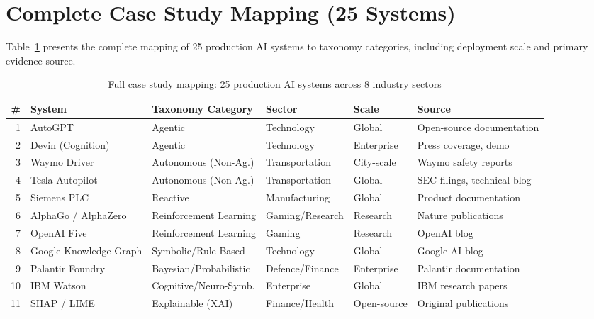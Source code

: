 \documentclass[acmlarge]{acmart}
\begin{document}
\section{Complete Case Study Mapping (25 Systems)}
\label{app:case-studies}

Table~\ref{tab:full-casestudies} presents the complete mapping of 25 production AI systems to taxonomy categories, including deployment scale and primary evidence source.

\begin{table}[ht]
\caption{Full case study mapping: 25 production AI systems across 8 industry sectors}
\label{tab:full-casestudies}
\small
\begin{tabular}{@{}rllllp{3cm}@{}}
\toprule
\textbf{\#} & \textbf{System} & \textbf{Taxonomy Category} & \textbf{Sector} & \textbf{Scale} & \textbf{Source} \\
\midrule
1  & AutoGPT           & Agentic                 & Technology      & Global   & Open-source documentation \\
2  & Devin (Cognition)  & Agentic                 & Technology      & Enterprise & Press coverage, demo \\
3  & Waymo Driver       & Autonomous (Non-Ag.)    & Transportation  & City-scale  & Waymo safety reports \\
4  & Tesla Autopilot    & Autonomous (Non-Ag.)    & Transportation  & Global   & SEC filings, technical blog \\
5  & Siemens PLC        & Reactive                & Manufacturing   & Global   & Product documentation \\
6  & AlphaGo / AlphaZero & Reinforcement Learning & Gaming/Research & Research   & Nature publications \\
7  & OpenAI Five        & Reinforcement Learning  & Gaming          & Research   & OpenAI blog \\
8  & Google Knowledge Graph & Symbolic/Rule-Based & Technology      & Global   & Google AI blog \\
9  & Palantir Foundry   & Bayesian/Probabilistic  & Defence/Finance & Enterprise & Palantir documentation \\
10 & IBM Watson          & Cognitive/Neuro-Symb.  & Enterprise      & Global   & IBM research papers \\
11 & SHAP / LIME        & Explainable (XAI)       & Finance/Health  & Open-source & Original publications \\

\end{tabular}
\end{table}
\end{document}
